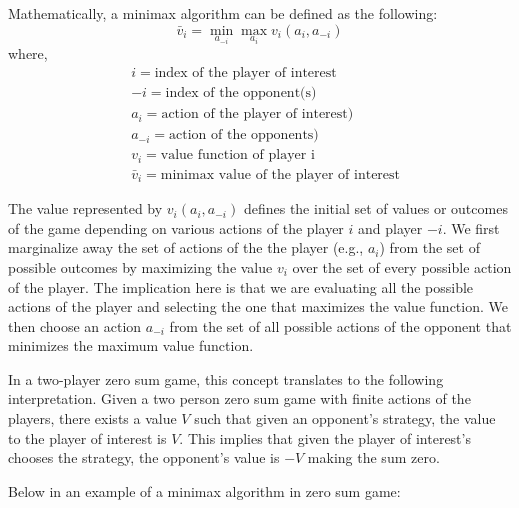Mathematically, a minimax algorithm can be defined as the following:
\begin{equation}
    \bar{v}_i = \min_{a_{-i}} \max_{a_{i}} v_i (a_i, a_{-i})
\end{equation}
where,
\begin{align}
    &i = \text{index of the player of interest} \\
    &-i = \text{index of the opponent(s)} \\
    &a_i= \text{action of the player of interest)} \\
    &a_{-i}= \text{action of the opponents)} \\
    &v_i = \text{value function of player i} \\
    &\bar{v}_i = \text{minimax value of the player of interest}
\end{align}

 The value represented by $v_i (a_i, a_{-i})$ defines the  initial set of values or outcomes of the game depending on various actions of the player $i$ and player $-i$. We first marginalize away the set of actions of the the player (e.g., $a_{i}$) from the set of possible outcomes by maximizing the value $v_i$ over the set of every possible action of the player. The implication here is that we are evaluating all the possible actions of the player and selecting the one that maximizes the value function.  We then choose an action $a_{-i}$ from the set of all possible actions of the opponent that minimizes the maximum value function. 

 In a two-player zero sum game, this concept translates to the following interpretation. Given a two person zero sum game with finite actions of the players, there exists a value $V$ such that given an opponent's strategy, the value to the player of interest is $V$. This implies that given the player of interest's chooses the strategy, the opponent's value is $-V$ making the sum zero.

 Below in an example of a minimax algorithm in zero sum game:

